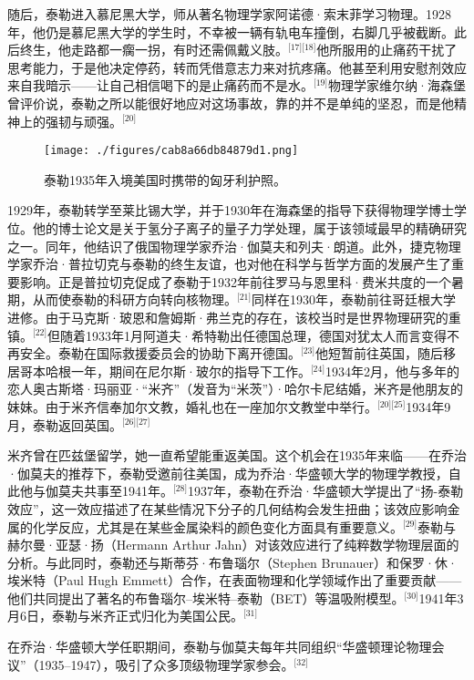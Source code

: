 随后，泰勒进入慕尼黑大学，师从著名物理学家阿诺德·索末菲学习物理。1928年，他仍是慕尼黑大学的学生时，不幸被一辆有轨电车撞倒，右脚几乎被截断。此后终生，他走路都一瘸一拐，有时还需佩戴义肢。\(^\text{[17][18]}\)他所服用的止痛药干扰了思考能力，于是他决定停药，转而凭借意志力来对抗疼痛。他甚至利用安慰剂效应来自我暗示——让自己相信喝下的是止痛药而不是水。\(^\text{[19]}\)物理学家维尔纳·海森堡曾评价说，泰勒之所以能很好地应对这场事故，靠的并不是单纯的坚忍，而是他精神上的强韧与顽强。\(^\text{[20]}\)
\begin{figure}[ht]
\centering
\texttt{[image: ./figures/cab8a66db84879d1.png]}
\caption{泰勒1935年入境美国时携带的匈牙利护照。} \label{fig_ADHTL_3}
\end{figure}
1929年，泰勒转学至莱比锡大学，并于1930年在海森堡的指导下获得物理学博士学位。他的博士论文是关于氢分子离子的量子力学处理，属于该领域最早的精确研究之一。同年，他结识了俄国物理学家乔治·伽莫夫和列夫·朗道。此外，捷克物理学家乔治·普拉切克与泰勒的终生友谊，也对他在科学与哲学方面的发展产生了重要影响。正是普拉切克促成了泰勒于1932年前往罗马与恩里科·费米共度的一个暑期，从而使泰勒的科研方向转向核物理。\(^\text{[21]}\)同样在1930年，泰勒前往哥廷根大学进修。由于马克斯·玻恩和詹姆斯·弗兰克的存在，该校当时是世界物理研究的重镇。\(^\text{[22]}\)但随着1933年1月阿道夫·希特勒出任德国总理，德国对犹太人而言变得不再安全。泰勒在国际救援委员会的协助下离开德国。\(^\text{[23]}\)他短暂前往英国，随后移居哥本哈根一年，期间在尼尔斯·玻尔的指导下工作。\(^\text{[24]}\)1934年2月，他与多年的恋人奥古斯塔·玛丽亚·“米齐”（发音为“米茨”）·哈尔卡尼结婚，米齐是他朋友的妹妹。由于米齐信奉加尔文教，婚礼也在一座加尔文教堂中举行。\(^\text{[20][25]}\)1934年9月，泰勒返回英国。\(^\text{[26][27]}\)

米齐曾在匹兹堡留学，她一直希望能重返美国。这个机会在1935年来临——在乔治·伽莫夫的推荐下，泰勒受邀前往美国，成为乔治·华盛顿大学的物理学教授，自此他与伽莫夫共事至1941年。\(^\text{[28]}\)1937年，泰勒在乔治·华盛顿大学提出了“扬-泰勒效应”，这一效应描述了在某些情况下分子的几何结构会发生扭曲；该效应影响金属的化学反应，尤其是在某些金属染料的颜色变化方面具有重要意义。\(^\text{[29]}\)泰勒与赫尔曼·亚瑟·扬（Hermann Arthur Jahn）对该效应进行了纯粹数学物理层面的分析。与此同时，泰勒还与斯蒂芬·布鲁瑙尔（Stephen Brunauer）和保罗·休·埃米特（Paul Hugh Emmett）合作，在表面物理和化学领域作出了重要贡献——他们共同提出了著名的布鲁瑙尔–埃米特–泰勒（BET）等温吸附模型。\(^\text{[30]}\)1941年3月6日，泰勒与米齐正式归化为美国公民。\(^\text{[31]}\)

在乔治·华盛顿大学任职期间，泰勒与伽莫夫每年共同组织“华盛顿理论物理会议”（1935–1947），吸引了众多顶级物理学家参会。\(^\text{[32]}\)

